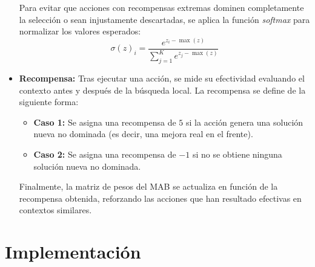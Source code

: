 \documentclass[12pt,a4paper]{book}
\begin{document}
\begin{itemize}
    Para evitar que acciones con recompensas extremas dominen completamente la selección o sean injustamente descartadas, se aplica la función \textit{softmax} para normalizar los valores esperados:
    \begin{equation}
        \sigma(z)_i = \frac{e^{z_i - \max(z)}}{\sum_{j=1}^{K} e^{z_j - \max(z)}}
    \end{equation}

    \item \textbf{Recompensa:} Tras ejecutar una acción, se mide su efectividad evaluando el contexto antes y después de la búsqueda local. La recompensa se define de la siguiente forma:
    \begin{itemize}
        \item \textbf{Caso 1:} Se asigna una recompensa de $5$ si la acción genera una solución nueva no dominada (es decir, una mejora real en el frente).
        \item \textbf{Caso 2:} Se asigna una recompensa de $-1$ si no se obtiene ninguna solución nueva no dominada.
    \end{itemize}

    Finalmente, la matriz de pesos del MAB se actualiza en función de la recompensa obtenida, reforzando las acciones que han resultado efectivas en contextos similares.
\end{itemize}

\newpage

\section{Implementación}
\end{document}
